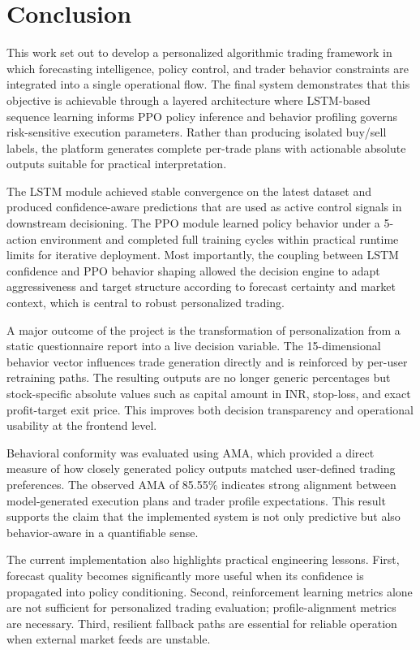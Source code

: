 \chapter{Conclusion}

This work set out to develop a personalized algorithmic trading framework in which forecasting intelligence, policy control, and trader behavior constraints are integrated into a single operational flow. The final system demonstrates that this objective is achievable through a layered architecture where LSTM-based sequence learning informs PPO policy inference and behavior profiling governs risk-sensitive execution parameters. Rather than producing isolated buy/sell labels, the platform generates complete per-trade plans with actionable absolute outputs suitable for practical interpretation.

The LSTM module achieved stable convergence on the latest dataset and produced confidence-aware predictions that are used as active control signals in downstream decisioning. The PPO module learned policy behavior under a 5-action environment and completed full training cycles within practical runtime limits for iterative deployment. Most importantly, the coupling between LSTM confidence and PPO behavior shaping allowed the decision engine to adapt aggressiveness and target structure according to forecast certainty and market context, which is central to robust personalized trading.

A major outcome of the project is the transformation of personalization from a static questionnaire report into a live decision variable. The 15-dimensional behavior vector influences trade generation directly and is reinforced by per-user retraining paths. The resulting outputs are no longer generic percentages but stock-specific absolute values such as capital amount in INR, stop-loss, and exact profit-target exit price. This improves both decision transparency and operational usability at the frontend level.

Behavioral conformity was evaluated using AMA, which provided a direct measure of how closely generated policy outputs matched user-defined trading preferences. The observed AMA of 85.55\% indicates strong alignment between model-generated execution plans and trader profile expectations. This result supports the claim that the implemented system is not only predictive but also behavior-aware in a quantifiable sense.

The current implementation also highlights practical engineering lessons. First, forecast quality becomes significantly more useful when its confidence is propagated into policy conditioning. Second, reinforcement learning metrics alone are not sufficient for personalized trading evaluation; profile-alignment metrics are necessary. Third, resilient fallback paths are essential for reliable operation when external market feeds are unstable.

